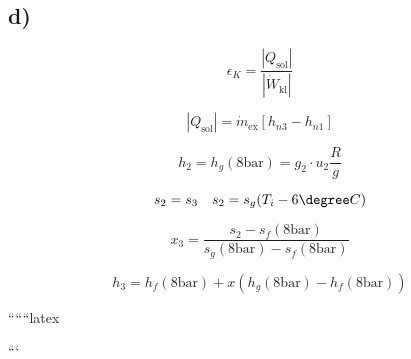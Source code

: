 

\subsection*{d)}

\[
\epsilon_K = \frac{|Q_{\text{sol}}|}{|\dot{W}_{\text{kl}}|}
\]

\[
|Q_{\text{sol}}| = \dot{m}_{\text{ex}} \left[ h_{n3} - h_{n1} \right]
\]

\[
h_2 = h_g (8 \text{bar}) = g_2 \cdot u_2 \frac{R}{g}
\]

\[
s_2 = s_3 \quad s_2 = s_g (T_i - 6 \degree C)
\]

\[
x_3 = \frac{s_2 - s_f (8 \text{bar})}{s_g (8 \text{bar}) - s_f (8 \text{bar})}
\]

\[
h_3 = h_f (8 \text{bar}) + x \left( h_g (8 \text{bar}) - h_f (8 \text{bar}) \right)
\]

``````latex


```